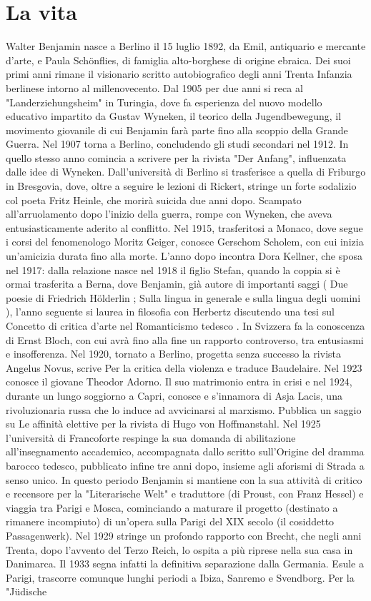 
\section{La vita}
Walter Benjamin nasce a Berlino il 15 luglio 1892, da Emil, antiquario e mercante d'arte, e Paula Schönflies, di famiglia alto-borghese di origine ebraica. Dei suoi primi anni rimane il visionario scritto autobiografico degli anni Trenta Infanzia berlinese intorno al millenovecento. Dal 1905 per due anni si reca al "Landerziehungsheim" in Turingia, dove fa esperienza del nuovo modello educativo impartito da Gustav Wyneken, il teorico della Jugendbewegung, il movimento giovanile di cui Benjamin farà parte fino alla scoppio della Grande Guerra. Nel 1907 torna a Berlino, concludendo gli studi secondari nel 1912. In quello stesso anno comincia a scrivere per la rivista "Der Anfang", influenzata dalle idee di Wyneken. Dall'università di Berlino si trasferisce a quella di Friburgo in Bresgovia, dove, oltre a seguire le lezioni di Rickert, stringe un forte sodalizio col poeta Fritz Heinle, che morirà suicida due anni dopo. Scampato all'arruolamento dopo l'inizio della guerra, rompe con Wyneken, che aveva entusiasticamente aderito al conflitto. Nel 1915, trasferitosi a Monaco, dove segue i corsi del fenomenologo Moritz Geiger, conosce Gerschom Scholem, con cui inizia un'amicizia durata fino alla morte. L'anno dopo incontra Dora Kellner, che sposa nel 1917: dalla relazione nasce nel 1918 il figlio Stefan, quando la coppia si è ormai trasferita a Berna, dove Benjamin, già autore di importanti saggi ( Due poesie di Friedrich Hölderlin ; Sulla lingua in generale e sulla lingua degli uomini ), l'anno seguente si laurea in filosofia con Herbertz discutendo una tesi sul Concetto di critica d'arte nel Romanticismo tedesco . In Svizzera fa la conoscenza di Ernst Bloch, con cui avrà fino alla fine un rapporto controverso, tra entusiasmi e insofferenza. Nel 1920, tornato a Berlino, progetta senza successo la rivista Angelus Novus, scrive Per la critica della violenza e traduce Baudelaire. Nel 1923 conosce il giovane Theodor Adorno. Il suo matrimonio entra in crisi e nel 1924, durante un lungo soggiorno a Capri, conosce e s'innamora di Asja Lacis, una rivoluzionaria russa che lo induce ad avvicinarsi al marxismo. Pubblica un saggio su Le affinità elettive per la rivista di Hugo von Hoffmanstahl. Nel 1925 l'università di Francoforte respinge la sua domanda di abilitazione all'insegnamento accademico, accompagnata dallo scritto sull'Origine del dramma barocco tedesco, pubblicato infine tre anni dopo, insieme agli aforismi di Strada a senso unico. In questo periodo Benjamin si mantiene con la sua attività di critico e recensore per la "Literarische Welt" e traduttore (di Proust, con Franz Hessel) e viaggia tra Parigi e Mosca, cominciando a maturare il progetto (destinato a rimanere incompiuto) di un'opera sulla Parigi del XIX secolo (il cosiddetto Passagenwerk). Nel 1929 stringe un profondo rapporto con Brecht, che negli anni Trenta, dopo l'avvento del Terzo Reich, lo ospita a più riprese nella sua casa in Danimarca. Il 1933 segna infatti la definitiva separazione dalla Germania. Esule a Parigi, trascorre comunque lunghi periodi a Ibiza, Sanremo e Svendborg. Per la "Jüdische 
